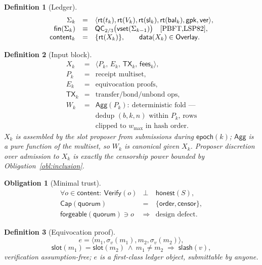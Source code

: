 \documentclass[11pt,letterpaper]{article}
\newtheorem{definition}{Definition}
\newtheorem{obligation}{Obligation}
\begin{document}
\begin{definition}[Ledger]\label{def:ledger}
\[
\begin{array}{rcl}
\Sigma_k&=&\langle
  \mathsf{rt}(t_k),\mathsf{rt}(V_k),\mathsf{rt}(\mathsf{sl}_k),
  \mathsf{rt}(\mathsf{bal}_k),\mathsf{gpk},\mathsf{ver}\rangle,\\
\mathsf{fin}(\Sigma_k)&\equiv&
  \mathsf{QC}_{2/3}\bigl(\mathsf{vset}(\Sigma_{k-1})\bigr)
  \quad\text{\cite{PBFT,LSP82}},\\
\mathsf{content}_k&=&\{\mathsf{rt}(X_k)\},\qquad
\mathsf{data}(X_k)\in\mathsf{Overlay}.
\end{array}
\]
\end{definition}

\begin{definition}[Input block]\label{def:input-block}
\[
\begin{array}{rcl}
X_k&=&\langle P_k,\,E_k,\,\mathsf{TX}_k,\,\mathsf{fees}_k\rangle,\\
P_k&=&\text{receipt multiset},\\
E_k&=&\text{equivocation proofs},\\
\mathsf{TX}_k&=&\text{transfer/bond/unbond ops},\\
W_k&=&\mathsf{Agg}(P_k):\ \text{deterministic fold ---}\\
&&\text{dedup $(b,k,n)$ within $P_k$, rows}\\
&&\text{clipped to $w_{\max}$ in hash order}.
\end{array}
\]
$X_k$ is assembled by the slot proposer from submissions during
$\mathsf{epoch}(k)$; $\mathsf{Agg}$ is a pure function of the multiset,
so $W_k$ is canonical given $X_k$.  Proposer discretion over
\emph{admission} to $X_k$ is exactly the censorship power bounded by
Obligation~\ref{obl:inclusion}.
\end{definition}

\begin{obligation}[Minimal trust]\label{obl:minimal-trust}
\[
\begin{array}{rcl}
\forall o\in\mathsf{content}:\ \mathsf{Verify}(o)&\perp&
  \mathsf{honest}(S),\\
\mathsf{Cap}(\mathsf{quorum})&=&
  \{\mathsf{order},\mathsf{censor}\},\\
\mathsf{forgeable}(\mathsf{quorum})\ni o&\Rightarrow&
  \text{design defect}.
\end{array}
\]
\end{obligation}

\begin{definition}[Equivocation proof]\label{def:equiv}
\[
e=\langle m_1,\sigma_v(m_1),m_2,\sigma_v(m_2)\rangle,
\]
\[
\mathsf{slot}(m_1)=\mathsf{slot}(m_2)\ \land\ m_1\neq m_2
\;\Rightarrow\;
\mathsf{slash}(v),
\]
verification assumption-free; $e$ is a first-class ledger object,
submittable by anyone.
\end{definition}
\end{document}
